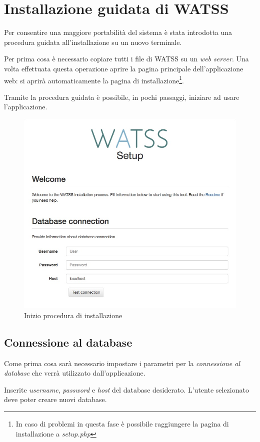 \appendix
\section{Installazione guidata di WATSS} \label{app:setup}

Per consentire una maggiore portabilità del sistema è stata introdotta una procedura guidata all'installazione su un nuovo terminale.

Per prima cosa è necessario copiare tutti i file di WATSS su un \emph{web server}. Una volta effettuata questa operazione aprire la pagina principale dell'applicazione web: si aprirà automaticamente la pagina di installazione\footnote{In caso di problemi in questa fase è possibile raggiungere la pagina di installazione a \emph{setup.php}}.

Tramite la procedura guidata è possibile, in pochi passaggi, iniziare ad usare l'applicazione.

\begin{figure}[h]
\centering
\includegraphics[width=0.8\linewidth]{images/setup1.jpg}
  \caption{Inizio procedura di installazione}
  \label{fig:setup1}
\end{figure}

\subsection{Connessione al database}

Come prima cosa sarà necessario impostare i parametri per la \emph{connessione al database} che verrà utilizzato dall'applicazione. 

Inserite \emph{username}, \emph{password} e \emph{host} del database desiderato. L'utente selezionato deve poter creare nuovi database.

